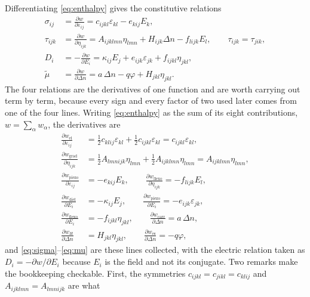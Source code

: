 Differentiating \eqref{eq:enthalpy} gives the constitutive relations
\begin{align}
\sigma_{ij}&=\frac{\partial w}{\partial\varepsilon_{ij}}
=c_{ijkl}\varepsilon_{kl}-e_{kij}E_k,
\label{eq:sigma}\\
\tau_{ijk}&=\frac{\partial w}{\partial\eta_{ijk}}
=A_{ijklmn}\eta_{lmn}+H_{ijk}\Delta n-f_{lijk}E_l,
\qquad \tau_{ijk}=\tau_{jik},
\label{eq:tau}\\
D_i&=-\frac{\partial w}{\partial E_i}
=\kappa_{ij}E_j+e_{ijk}\varepsilon_{jk}+f_{ijkl}\eta_{jkl},
\label{eq:D}\\
\widetilde\mu&=\frac{\partial w}{\partial\Delta n}
=a\,\Delta n-q\varphi+H_{jkl}\eta_{jkl}.
\label{eq:mu}
\end{align}
The four relations are the derivatives of one function and are worth carrying
out term by term, because every sign and every factor of two used later comes
from one of the four lines.  Writing \eqref{eq:enthalpy} as the sum of its eight
contributions, $w=\sum_\alpha w_\alpha$, the derivatives are
\begin{align}
\frac{\partial w_{\text{el}}}{\partial\varepsilon_{ij}}
&=\tfrac12 c_{klij}\varepsilon_{kl}+\tfrac12 c_{ijkl}\varepsilon_{kl}
=c_{ijkl}\varepsilon_{kl},\label{eq:diff_el}\\[2pt]
\frac{\partial w_{\text{grad}}}{\partial\eta_{ijk}}
&=\tfrac12 A_{lmnijk}\eta_{lmn}+\tfrac12 A_{ijklmn}\eta_{lmn}
=A_{ijklmn}\eta_{lmn},\\[2pt]
\frac{\partial w_{\text{piezo}}}{\partial\varepsilon_{ij}}&=-e_{kij}E_k,
\qquad
\frac{\partial w_{\text{flexo}}}{\partial\eta_{ijk}}=-f_{lijk}E_l,
\label{eq:diff_coup}\\[2pt]
\frac{\partial w_{\text{diel}}}{\partial E_i}&=-\kappa_{ij}E_j,
\qquad
\frac{\partial w_{\text{piezo}}}{\partial E_i}=-e_{ijk}\varepsilon_{jk},
\label{eq:diff_elec}\\[2pt]
\frac{\partial w_{\text{flexo}}}{\partial E_i}&=-f_{ijkl}\eta_{jkl},
\qquad
\frac{\partial w_{\text{carr}}}{\partial\Delta n}=a\,\Delta n,
\label{eq:diff_carr}\\[2pt]
\frac{\partial w_{H}}{\partial\Delta n}&=H_{jkl}\eta_{jkl},
\qquad
\frac{\partial w_{\text{es}}}{\partial\Delta n}=-q\varphi,
\label{eq:diff_es}
\end{align}
and \eqref{eq:sigma}--\eqref{eq:mu} are these lines collected, with the electric
relation taken as $D_i=-\partial w/\partial E_i$ because $E_i$ is the field and
not its conjugate.  Two remarks make the bookkeeping checkable.  First, the
symmetries $c_{ijkl}=c_{jikl}=c_{klij}$ and $A_{ijklmn}=A_{lmnijk}$ are what
